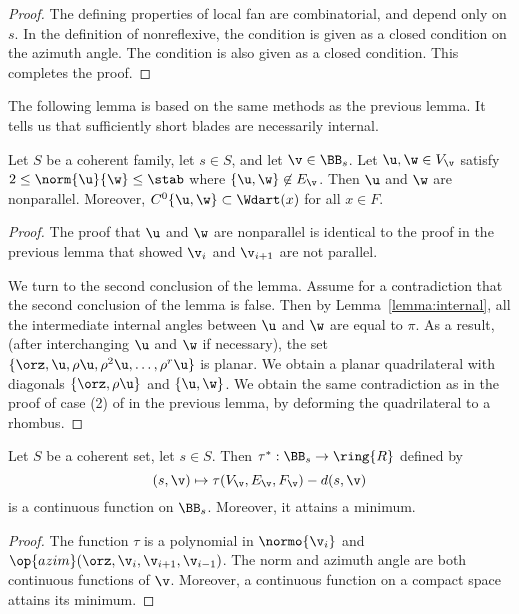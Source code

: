 \begin{proof}
The defining properties of local fan are combinatorial, and depend only on 
$s$.
In the definition of nonreflexive, the condition  is given
as a closed condition on the azimuth angle.  The condition
 is also given as a closed condition.
This completes the proof.
\end{proof}

The following lemma is based on the same methods as the previous
lemma.  It tells us that sufficiently short blades are necessarily
internal.

\begin{lemma}[]\label{lemma:2hm-slice}
Let $S$ be a coherent family, let $s\in S$, and let $\v\in \BB_s$.
Let $\u,\w\in V_\v$ satisfy $2\le\norm{\u}{\w}\le \stab$ where
$\{\u,\w\}\not\in E_\v$.  Then $\u$ and $\w$ are nonparallel.
Moreover,
$C^0\{\u,\w\}\subset \Wdart(x)$ for all $x\in F$.
\end{lemma}

\begin{proof} 
The proof that $\u$ and $\w$ are nonparallel is identical to the
proof in the previous lemma that showed $\v_i$ and $\v_{i+1}$ are not parallel.

We turn to the second conclusion of the lemma.
Assume for a contradiction that the second conclusion of the lemma is false.
Then by Lemma~\ref{lemma:internal}, all the intermediate internal
angles between $\u$ and $\w$ are equal to $\pi$.  As a result, (after
interchanging $\u$ and $\w$ if necessary), the set
$\{\orz,\u,\rho\u,\rho^2\u,\ldots,\rho^r\u\}$ is planar.
We obtain a planar quadrilateral with diagonals
$\{\orz,\rho\u\}$ and $\{\u,\w\}$.  We obtain the same contradiction
as in the proof of case (2) of  in the previous lemma,
by deforming the quadrilateral to a rhombus.
\end{proof}

\begin{lemma}[continuity]\rating{}\label{lemma:compact-fan}
Let $S$ be a coherent set, let $s\in S$.  Then $\tau^*:\BB_s\to\ring{R}$ defined
by
\[ 
(s,\v) \mapsto \tau(V_\v,E_\v,F_\v)-d(s,\v)
\] 
is a continuous function on $\BB_s$.  Moreover, it attains a minimum.
\end{lemma}

\begin{proof} 
The function $\tau$ is a polynomial in $\normo{\v_i}$ and
$\op{azim}(\orz,\v_i,\v_{i+1},\v_{i-1})$.  The norm and azimuth
angle are both continuous functions of $\v$.
Moreover, a continuous function on a compact space attains its minimum.
\end{proof}



